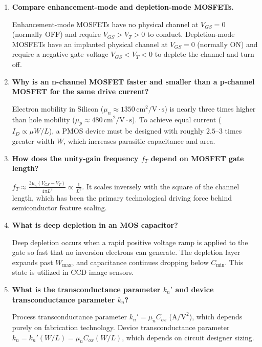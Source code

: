 \documentclass[12pt,a4paper]{article}
\newcommand{\Q}[1]{\textbf{#1}\par\noindent\ignorespaces}
\begin{document}
\begin{tcolorbox}[exambox, title={\textbf{Frequently Asked / Viva Questions}}]
\begin{enumerate}[topsep=0pt, label=\textbf{Q\arabic*.}, itemsep=5pt]
  \item \Q{Compare enhancement-mode and depletion-mode MOSFETs.}
    Enhancement-mode MOSFETs have no physical channel at $V_{GS} = 0$ (normally OFF) and require $V_{GS} > V_T > 0$ to conduct. Depletion-mode MOSFETs have an implanted physical channel at $V_{GS} = 0$ (normally ON) and require a negative gate voltage $V_{GS} < V_T < 0$ to deplete the channel and turn off.
  \item \Q{Why is an n-channel MOSFET faster and smaller than a p-channel MOSFET for the same drive current?}
    Electron mobility in Silicon ($\mu_n \approx 1350\,\text{cm}^2/\text{V}\cdot\text{s}$) is nearly three times higher than hole mobility ($\mu_p \approx 480\,\text{cm}^2/\text{V}\cdot\text{s}$). To achieve equal current ($I_D \propto \mu W/L$), a PMOS device must be designed with roughly $2.5\text{--}3$ times greater width $W$, which increases parasitic capacitance and area.
  \item \Q{How does the unity-gain frequency $f_T$ depend on MOSFET gate length?}
    $f_T \approx \frac{3\mu_n(V_{GS}-V_T)}{4\pi L^2} \propto \frac{1}{L^2}$. It scales inversely with the square of the channel length, which has been the primary technological driving force behind semiconductor feature scaling.
  \item \Q{What is deep depletion in an MOS capacitor?}
    Deep depletion occurs when a rapid positive voltage ramp is applied to the gate so fast that no inversion electrons can generate. The depletion layer expands past $W_{\text{max}}$, and capacitance continues dropping below $C_{\text{min}}$. This state is utilized in CCD image sensors.
  \item \Q{What is the transconductance parameter $k_n'$ and device transconductance parameter $k_n$?}
    Process transconductance parameter $k_n' = \mu_n C_{ox}$ ($\text{A/V}^2$), which depends purely on fabrication technology. Device transconductance parameter $k_n = k_n' (W/L) = \mu_n C_{ox} (W/L)$, which depends on circuit designer sizing.
\end{enumerate}
\end{tcolorbox}
\end{document}

